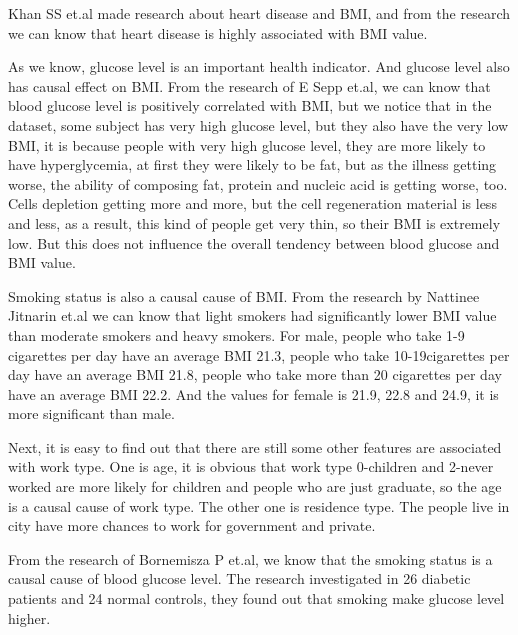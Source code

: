 \documentclass[letterpaper,12pt]{article}
\begin{document}
Khan SS et.al\cite{khan2018association} made research about heart disease and BMI, and from the research we can know that heart disease is highly associated with BMI value.\par

As we know, glucose level is an important health indicator. And glucose level also has causal effect on BMI. From the research of E Sepp et.al\cite{sepp2014higher}, we can know that blood glucose level is positively correlated with BMI, but we notice that in the dataset, some subject has very high glucose level, but they also have the very low BMI, it is because people with very high glucose level, they are more likely to have hyperglycemia, at first they were likely to be fat, but as the illness getting worse, the ability of composing fat, protein and nucleic acid is getting worse, too. Cells depletion getting more and more, but the cell regeneration material is less and less, as a result, this kind of people get very thin, so their BMI is extremely low. But this does not influence the overall tendency between blood glucose and BMI value.\par



Smoking status is also a causal cause of BMI. From the research by Nattinee Jitnarin et.al\cite{jitnarin2014relationship} we can know that light smokers had significantly lower BMI value than moderate smokers and heavy smokers. For male, people who take 1-9 cigarettes per day have an average BMI 21.3, people who take 10-19cigarettes per day have an average BMI 21.8, people who take more than 20 cigarettes per day have an average BMI 22.2. And the values for female is 21.9, 22.8 and 24.9, it is more significant than male.\par

Next, it is easy to find out that there are still some other features are associated with work type. One is age, it is obvious that work type 0-children and 2-never worked are more likely for children and people who are just graduate, so the age is a causal cause of work type. The other one is residence type. The people live in city have more chances to work for government and private.\par

From the research of Bornemisza P et.al\cite{bornemisza1980effect}, we know that the smoking status is a causal cause of blood glucose level. The research investigated in 26 diabetic patients and 24 normal controls, they found out that smoking make glucose level higher.\par
\end{document}
